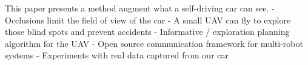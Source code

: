 This paper presents a method augment what a self-driving car can see.
- Occlusions limit the field of view of the car
- A small UAV can fly to explore those blind spots and prevent accidents
- Informative / exploration planning algorithm for the UAV
- Open source communication framework for multi-robot systems
- Experiments with real data captured from our car